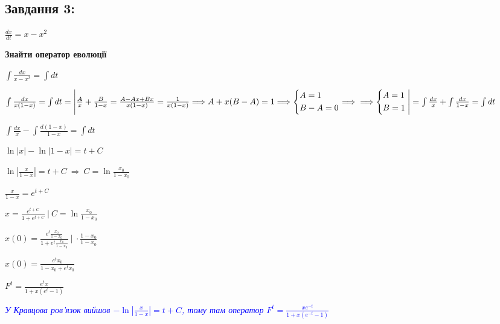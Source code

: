 \subsection{Завдання 3:}

$\frac{dx}{dt} = x - x^2$

\textbf{Знайти оператор еволюції}

$\int \frac{dx}{x - x^2} = \int dt$
\label{pr2:tsk3}

$\int \frac{dx}{x(1-x)} = \int dt = \Bigg{|}\frac{A}{x} + \frac{B}{1-x} = \frac{A - Ax + Bx}{x(1-x)} = \frac{1}{x(1-x)}
\Longrightarrow A +x(B-A) = 1\Longrightarrow \left\{\begin{aligned}
    &A = 1\\
    &B-A = 0
\end{aligned}\right. \Longrightarrow \\\Longrightarrow \left\{\begin{aligned}
    &A = 1\\
    &B = 1
\end{aligned}\right. \Bigg{|} = \int \frac{dx}{x} + \int \frac{dx}{1-x} = \int dt$

$\int \frac{dx}{x} - \int \frac{d(1-x)}{1-x} = \int dt$

$\ln|x| - \ln |1-x| = t +C$

$\ln |\frac{x}{1-x}| = t + C \ \Longrightarrow\ C = \ln \frac{x_0}{1-x_0}$

$\frac{x}{1-x} = e^{t+C}$

$x = \frac{e^{t+C}}{1+e^{t +C}} \ | \ C = \ln \frac{x_0}{1-x_0}$

$x(0) = \frac{e^t\frac{x_0}{1-x_0}}{1+e^t\frac{x_0}{1-x_0}} \ |\ \cdot \frac{1-x_0}{1-x_0}$

$x(0) = \frac{e^tx_0}{1-x_0 + e^tx_0}$

$F^t = \frac{e^tx}{1+x(e^t- 1)}$

\textcolor{blue}{\textit{У Кравцова ров'язок вийшов $-\ln |\frac{x}{1-x}| = t +C$, тому там оператор }
$F^t = \frac{xe^{-t}}{1+x(e^{-t} - 1 )}$}